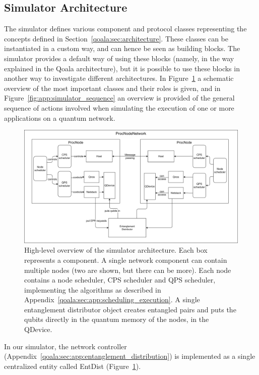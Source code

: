 \subsection{Simulator Architecture}
The simulator defines various component and protocol classes representing the concepts defined in Section~\ref{qoala:sec:architecture}. These classes can be instantiated in a custom way, and can hence be seen as building blocks. The simulator provides a default way of using these blocks (namely, in the way explained in the Qoala architecture), but it is possible to use these blocks in another way to investigate different architectures.
In Figure~\ref{fig:app:simulator} a schematic overview of the most important classes and their roles is given, and in Figure~\ref{fig:app:simulator_sequence} an overview is provided of the general sequence of actions involved when simulating the execution of one or more applications on a quantum network.


\begin{figure}[hp]
    \centering
    \includegraphics[width=\textwidth]{figures/qoala/simulator.png}
    \caption{High-level overview of the simulator architecture. Each box represents a component.
    A single network component can contain multiple nodes (two are shown, but there can be more).
    Each node contains a node scheduler, CPS scheduler and QPS scheduler, implementing the algorithms as described in Appendix~\ref{qoala:sec:app:scheduling_execution}.
    A single entanglement distributor object creates entangled pairs and puts the qubits directly in the quantum memory of the nodes, in the QDevice.
    }
    \label{fig:app:simulator}
\end{figure}

In our simulator, the network controller (Appendix~\ref{qoala:sec:app:entanglement_distribution})
is implemented as a single centralized entity called EntDist (Figure~\ref{fig:app:simulator}).

